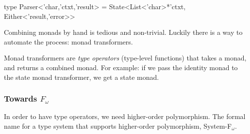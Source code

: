   \begin{code}[language=Caml]
  type Parser<'char,'ctxt,'result> =
    State<List<'char>*'ctxt,
          Either<'result,'error>>
  \end{code}

  Combining monads by hand is tedious and non-trivial.
  Luckily there is a way to automate the process: monad transformers.\cite[Chapter~18]{Haskell}

  Monad transformers are \textit{type operators} (type-level functions) that takes a monad, and returns a combined monad.
  For example: if we pass the identity monad to the state monad transformer, we get a state monad.

  \subsubsection*{Towards $F_\omega$}
  In order to have type operators, we need higher-order polymorphism.
  The formal name for a type system that supports higher-order polymorphism, System-F$_\omega$.\cite[Chapter~30]{Pierce02}
  
  
